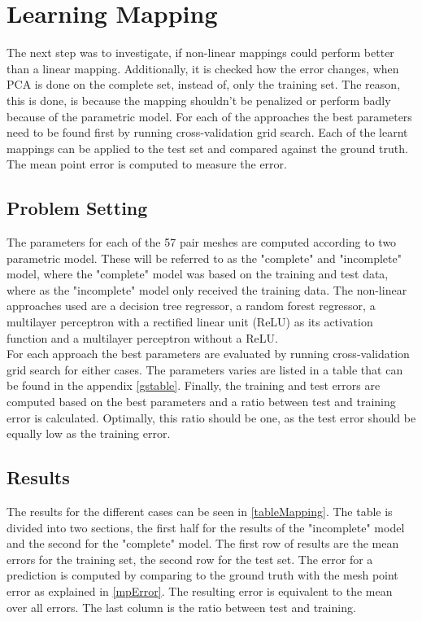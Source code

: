 \section{Learning Mapping}
The next step was to investigate, if non-linear mappings could perform better than a linear mapping. Additionally, it is checked how the error changes, when PCA is done on the complete set, instead of, only the training set. The reason, this is done, is because the mapping shouldn't be penalized or perform badly because of the parametric model. For each of the approaches the best parameters need to be found first by running cross-validation grid search. Each of the learnt mappings can be applied to the test set and compared against the ground truth. The mean point error is computed to measure the error.

\subsection{Problem Setting}
The parameters for each of the 57 pair meshes are computed according to two parametric model. These will be referred to as the "complete" and "incomplete" model, where the "complete" model was based on the training and test data, where as the "incomplete" model only received the training data. The non-linear approaches used are a decision tree regressor, a random forest regressor, a multilayer perceptron with a rectified linear unit (ReLU) as its activation function and a multilayer perceptron without a ReLU. \\
For each approach the best parameters are evaluated by running cross-validation grid search for either cases. The parameters varies are listed in a table that can be found in the appendix \ref{gstable}.
Finally, the training and test errors are computed based on the best parameters and a ratio between test and training error is calculated. Optimally, this ratio should be one, as the test error should be equally low as the training error.

\subsection{Results}
The results for the different cases can be seen in \ref{tableMapping}. The table is divided into two sections, the first half for the results of the "incomplete" model and the second for the "complete" model. The first row of results are the mean errors for the training set, the second row for the test set. The error for a prediction is computed by comparing to the ground truth with the mesh point error as explained in \ref{mpError}. The resulting error is equivalent to the mean over all errors. The last column is the ratio between test and training.

